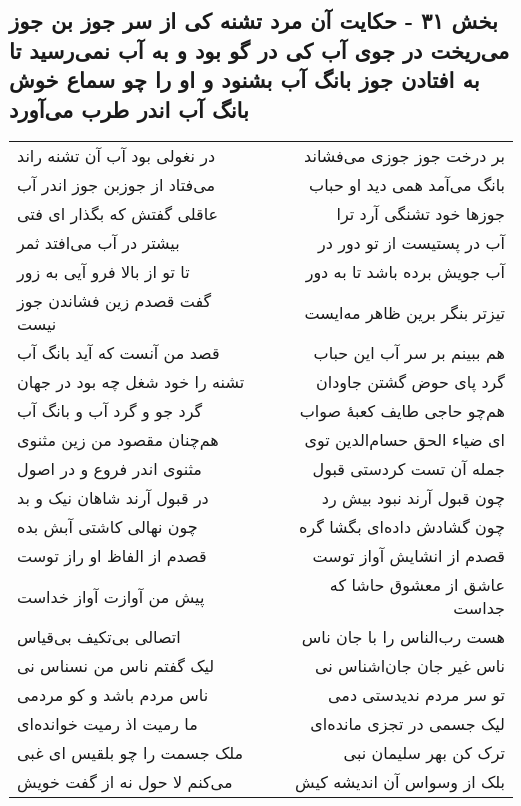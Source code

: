 \begin{center}
\section*{بخش ۳۱ - حکایت آن مرد تشنه کی از سر جوز بن جوز می‌ریخت در جوی آب کی در گو بود و به آب نمی‌رسید تا به افتادن جوز بانگ آب بشنود و او را چو سماع خوش بانگ آب اندر طرب می‌آورد}
\label{sec:sh031}
\begin{longtable}{l p{0.5cm} r}
در نغولی بود آب آن تشنه راند
&&
بر درخت جوز جوزی می‌فشاند
\\
می‌فتاد از جوزبن جوز اندر آب
&&
بانگ می‌آمد همی دید او حباب
\\
عاقلی گفتش که بگذار ای فتی
&&
جوزها خود تشنگی آرد ترا
\\
بیشتر در آب می‌افتد ثمر
&&
آب در پستیست از تو دور در
\\
تا تو از بالا فرو آیی به زور
&&
آب جویش برده باشد تا به دور
\\
گفت قصدم زین فشاندن جوز نیست
&&
تیزتر بنگر برین ظاهر مه‌ایست
\\
قصد من آنست که آید بانگ آب
&&
هم ببینم بر سر آب این حباب
\\
تشنه را خود شغل چه بود در جهان
&&
گرد پای حوض گشتن جاودان
\\
گرد جو و گرد آب و بانگ آب
&&
هم‌چو حاجی طایف کعبهٔ صواب
\\
هم‌چنان مقصود من زین مثنوی
&&
ای ضیاء الحق حسام‌الدین توی
\\
مثنوی اندر فروع و در اصول
&&
جمله آن تست کردستی قبول
\\
در قبول آرند شاهان نیک و بد
&&
چون قبول آرند نبود بیش رد
\\
چون نهالی کاشتی آبش بده
&&
چون گشادش داده‌ای بگشا گره
\\
قصدم از الفاظ او راز توست
&&
قصدم از انشایش آواز توست
\\
پیش من آوازت آواز خداست
&&
عاشق از معشوق حاشا که جداست
\\
اتصالی بی‌تکیف بی‌قیاس
&&
هست رب‌الناس را با جان ناس
\\
لیک گفتم ناس من نسناس نی
&&
ناس غیر جان جان‌اشناس نی
\\
ناس مردم باشد و کو مردمی
&&
تو سر مردم ندیدستی دمی
\\
ما رمیت اذ رمیت خوانده‌ای
&&
لیک جسمی در تجزی مانده‌ای
\\
ملک جسمت را چو بلقیس ای غبی
&&
ترک کن بهر سلیمان نبی
\\
می‌کنم لا حول نه از گفت خویش
&&
بلک از وسواس آن اندیشه کیش
\\

\end{longtable}
\end{center}

